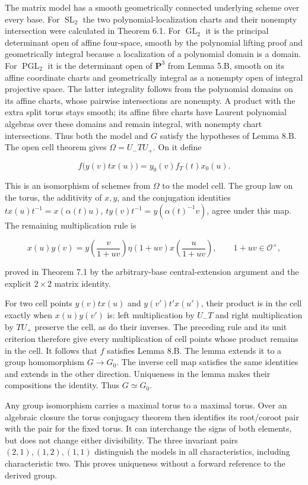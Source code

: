 \documentclass[11pt,a4paper,openany]{report}
\newcounter{none}
\begin{document}
The matrix model has a smooth geometrically connected underlying scheme over every base. For \(\operatorname{SL}_2\) the two polynomial-localization charts and their nonempty intersection were calculated in Theorem 6.1. For \(\operatorname{GL}_2\) it is the principal determinant open of affine four-space, smooth by the polynomial lifting proof and geometrically integral because a localization of a polynomial domain is a domain. For \(\operatorname{PGL}_2\) it is the determinant open of \(\mathbf P^3\) from Lemma 5.B, smooth on its affine coordinate charts and geometrically integral as a nonempty open of integral projective space. The latter integrality follows from the polynomial domains on its affine charts, whose pairwise intersections are nonempty. A product with the extra split torus stays smooth; its affine fibre charts have Laurent polynomial algebras over these domains and remain integral, with nonempty chart intersections. Thus both the model and \(G\) satisfy the hypotheses of Lemma 8.B. The open cell theorem gives \(\Omega=U_-TU_+\). On it define

\[
f\bigl(y(v)t x(u)\bigr)=y_0(v)f_T(t)x_0(u).
\]

This is an isomorphism of schemes from \(\Omega\) to the model cell. The group law on the torus, the additivity of \(x,y\), and the conjugation identities \(t x(u)t^{-1}=x(\alpha(t)u)\), \(t y(v)t^{-1}=y(\alpha(t)^{-1}v)\), agree under this map. The remaining multiplication rule is

\[
x(u)y(v)=y\left(\frac{v}{1+uv}\right)
\eta(1+uv)x\left(\frac{u}{1+uv}\right),
\qquad 1+uv\in\mathcal O^\times,
\]

proved in Theorem 7.1 by the arbitrary-base central-extension argument and the explicit \(2\times2\) matrix identity.

For two cell points \(y(v)t x(u)\) and \(y(v')t'x(u')\), their product is in the cell exactly when \(x(u)y(v')\) is: left multiplication by \(U_-T\) and right multiplication by \(TU_+\) preserve the cell, as do their inverses. The preceding rule and its unit criterion therefore give every multiplication of cell points whose product remains in the cell. It follows that \(f\) satisfies Lemma 8.B. The lemma extends it to a group homomorphism \(G\to G_0\). The inverse cell map satisfies the same identities and extends in the other direction. Uniqueness in the lemma makes their compositions the identity. Thus \(G\simeq G_0\).

Any group isomorphism carries a maximal torus to a maximal torus. Over an algebraic closure the torus conjugacy theorem then identifies its root/coroot pair with the pair for the fixed torus. It can interchange the signs of both elements, but does not change either divisibility. The three invariant pairs \((2,1),(1,2),(1,1)\) distinguish the models in all characteristics, including characteristic two. This proves uniqueness without a forward reference to the derived group.
\end{document}
